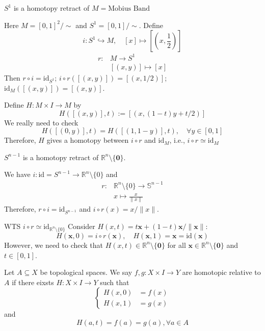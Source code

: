 \begin{example}
$S^1$ is a homotopy retract of $M=\text{Mobius Band}$

Here $M=[0,1]^2/\sim$ and $S^1=[0,1]/\sim$.
Define
\[
i:S^1\hookrightarrow M,\quad
[x]\mapsto [(x,\frac{1}{2})]
\]
\[
\begin{array}{ll}
r:&M\to S^1\\
&[(x,y)]\mapsto[x]
\end{array}
\]
Then $r\circ i = \text{id}_{S^1}$; $i\circ r([(x,y)]) = [(x,1/2)]$; $\text{id}_M([(x,y)]) = [(x,y)]$.

Define $H:M\times I\to M$ by
\[
H([(x,y)],t):=[(x,(1-t)y+t/2)]
\]
We really need to check
\[
H([(0,y)],t)=H([(1,1-y)],t),\quad \forall y\in[0,1]
\]
Therefore, $H$ gives a homotopy between $i\circ r$ and $\text{id}_{M}$, i.e., $i\circ r\simeq\text{id}_M$
\end{example}

$S^{n-1}$ is a homotopy retract of $\mathbb{R}^n\setminus\{\bm0\}$.

We have $i:\text{id}=S^{n-1}\to\mathbb{R}^n\setminus\{0\}$
and
\[
\begin{array}{ll}
r:&\mathbb{R}^n\setminus\{0\}\to \mathbb{S}^{n-1}\\
&x\mapsto\frac{x}{\|x\|}
\end{array}
\]
Therefore, $r\circ i =\text{id}_{S^{n-1}}$ and $i\circ r(x)=x/\|x\|$.

WTS $i\circ r\simeq\text{id}_{\mathbb{R}^n\setminus\{0\}}$
Consider $H(x,t)=t\bm x+(1-t)\bm x/\|\bm x\|$:
\[
H(\bm x,0)=i\circ r(\bm x),\quad
H(\bm x,1)=\bm x=\text{id}(\bm x)
\]
However, we need to check that $H(x,t)\in\mathbb{R}^n\setminus\{\bm0\}$ for all $\bm x\in\mathbb{R}^n\setminus\{\bm0\}$ and $t\in[0,1]$.

\begin{definition}
Let $A\subseteq X$ be topological spaces.
We say $f,g:X\times I\to Y$ are homotopic relative to $A$ if there eixsts $H:X\times I\to Y$ such that
\[
\left\{
\begin{aligned}
H(x,0)&=f(x)\\
H(x,1)&=g(x)
\end{aligned}
\right.
\]
and
\[
H(a,t)=f(a)=g(a),\forall a\in A
\]
\end{definition}














